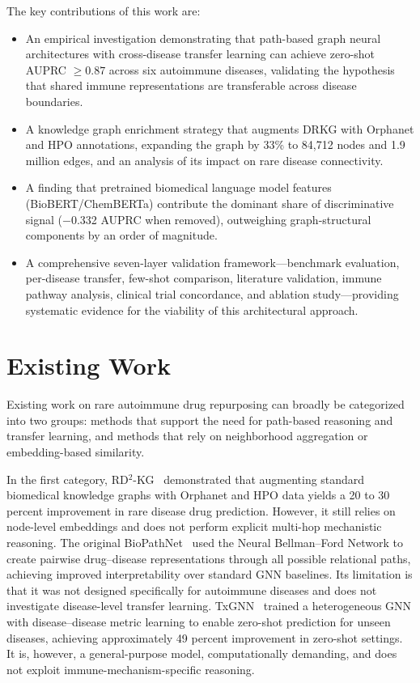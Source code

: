 \documentclass[conference]{IEEEtran}
\begin{document}
The key contributions of this work are:
\begin{itemize}
    \item An empirical investigation demonstrating that path-based graph neural architectures with cross-disease transfer learning can achieve zero-shot AUPRC $\geq 0.87$ across six autoimmune diseases, validating the hypothesis that shared immune representations are transferable across disease boundaries.
    \item A knowledge graph enrichment strategy that augments DRKG with Orphanet and HPO annotations, expanding the graph by 33\% to 84,712 nodes and 1.9 million edges, and an analysis of its impact on rare disease connectivity.
    \item A finding that pretrained biomedical language model features (BioBERT/ChemBERTa) contribute the dominant share of discriminative signal ($-$0.332 AUPRC when removed), outweighing graph-structural components by an order of magnitude.
    \item A comprehensive seven-layer validation framework---benchmark evaluation, per-disease transfer, few-shot comparison, literature validation, immune pathway analysis, clinical trial concordance, and ablation study---providing systematic evidence for the viability of this architectural approach.
\end{itemize}

\section{Existing Work}

Existing work on rare autoimmune drug repurposing can broadly be categorized into two groups: methods that support the need for path-based reasoning and transfer learning, and methods that rely on neighborhood aggregation or embedding-based similarity.

In the first category, RD$^2$-KG~\cite{rd2kg} demonstrated that augmenting standard biomedical knowledge graphs with Orphanet and HPO data yields a 20 to 30 percent improvement in rare disease drug prediction. However, it still relies on node-level embeddings and does not perform explicit multi-hop mechanistic reasoning. The original BioPathNet~\cite{nbfnet} used the Neural Bellman--Ford Network to create pairwise drug--disease representations through all possible relational paths, achieving improved interpretability over standard GNN baselines. Its limitation is that it was not designed specifically for autoimmune diseases and does not investigate disease-level transfer learning. TxGNN~\cite{txgnn} trained a heterogeneous GNN with disease--disease metric learning to enable zero-shot prediction for unseen diseases, achieving approximately 49 percent improvement in zero-shot settings. It is, however, a general-purpose model, computationally demanding, and does not exploit immune-mechanism-specific reasoning.
\end{document}
